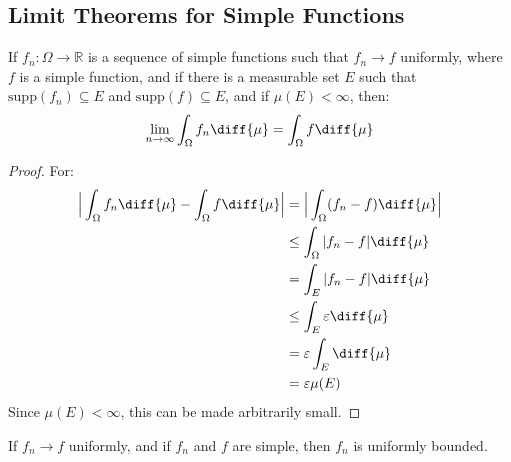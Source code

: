             \subsection{Limit Theorems for Simple Functions}
                \begin{theorem}
                    If $f_{n}:\Omega\rightarrow\mathbb{R}$ is
                    a sequence of simple functions such that
                    $f_{n}\rightarrow{f}$ uniformly,
                    where $f$ is a simple function,
                    and if there is a measurable set $E$
                    such that $\mathrm{supp}(f_{n})\subseteq{E}$ and
                    $\mathrm{supp}(f)\subseteq{E}$, and if
                    $\mu(E)<\infty$, then:
                    \begin{equation}
                        \underset{n\rightarrow\infty}{\lim}
                        \int_{\Omega}f_{n}\diff{\mu}
                        =\int_{\Omega}f\diff{\mu}
                    \end{equation}
                \end{theorem}
                \begin{proof}
                    For:
                    \begin{align}
                        \Big|
                            \int_{\Omega}f_{n}\diff{\mu}-
                            \int_{\Omega}f\diff{\mu}
                        \Big|
                        &=\Big|\int_{\Omega}(f_{n}-f)\diff{\mu}
                            \Big|\\
                        &\leq\int_{\Omega}|f_{n}-f|\diff{\mu}\\
                        &=\int_{E}|f_{n}-f|\diff{\mu}\\
                        &\leq\int_{E}\varepsilon\diff{\mu}\\
                        &=\varepsilon\int_{E}\diff{\mu}\\
                        &=\varepsilon\mu(E)
                    \end{align}
                    Since $\mu(E)<\infty$, this can be made
                    arbitrarily small.
                \end{proof}
                \begin{theorem}
                    If $f_{n}\rightarrow{f}$ uniformly, and if
                    $f_{n}$ and $f$ are simple, then
                    $f_{n}$ is uniformly bounded.
                \end{theorem}
